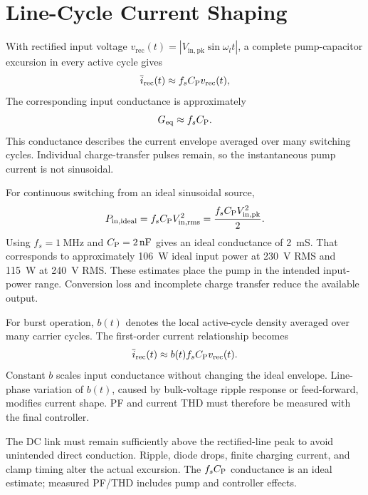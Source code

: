 \section{Line-Cycle Current Shaping}
\label{sec:analysis-linecycle}

With rectified input voltage \(v_{\mathrm{rec}}(t)=|V_{\mathrm{in,pk}}\sin\omega_l t|\), a complete pump-capacitor excursion in every active cycle gives
\begin{equation}
\overline{i}_{\mathrm{rec}}(t)\approx f_sC_{\mathrm{P}} v_{\mathrm{rec}}(t),
\label{eq:analysis-input-envelope}
\end{equation}
The corresponding input conductance is approximately
\begin{equation}
G_{\mathrm{eq}}\approx f_sC_{\mathrm{P}}.
\end{equation}
This conductance describes the current envelope averaged over many switching cycles. Individual charge-transfer pulses remain, so the instantaneous pump current is not sinusoidal.

For continuous switching from an ideal sinusoidal source,
\begin{equation}
P_{\mathrm{in,ideal}}=f_sC_{\mathrm{P}} V_{\mathrm{in,rms}}^2
=\frac{f_sC_{\mathrm{P}} V_{\mathrm{in,pk}}^2}{2}.
\label{eq:analysis-ideal-input-power}
\end{equation}
Using \(f_s=\SI{1}{\mega\hertz}\) and \(C_{\mathrm{P}}=\SI{2}{\nano\farad}\) gives an ideal conductance of \SI{2}{\milli\siemens}. That corresponds to approximately \SI{106}{\watt} ideal input power at \SI{230}{\volt} RMS and \SI{115}{\watt} at \SI{240}{\volt} RMS. These estimates place the pump in the intended input-power range. Conversion loss and incomplete charge transfer reduce the available output.

For burst operation, \(b(t)\) denotes the local active-cycle density averaged over many carrier cycles. The first-order current relationship becomes
\begin{equation}
\overline{i}_{\mathrm{rec}}(t)\approx b(t)f_sC_{\mathrm{P}} v_{\mathrm{rec}}(t).
\end{equation}
Constant \(b\) scales input conductance without changing the ideal envelope. Line-phase variation of \(b(t)\), caused by bulk-voltage ripple response or feed-forward, modifies current shape. PF and current THD must therefore be measured with the final controller.

The DC link must remain sufficiently above the rectified-line peak to avoid unintended direct conduction. Ripple, diode drops, finite charging current, and clamp timing alter the actual excursion. The \(f_sC_{\mathrm{P}}\) conductance is an ideal estimate; measured PF/THD includes pump and controller effects.

